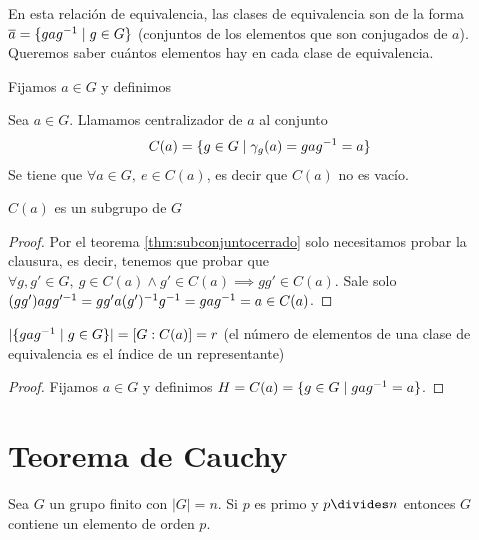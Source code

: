 En esta relación de equivalencia, las clases de equivalencia son de la forma $\overline{a} = \{gag^{-1} \mid g \in G\}$ (conjuntos de los elementos que son conjugados de $a$). Queremos saber cuántos elementos hay en cada clase de equivalencia.

Fijamos $a \in G$ y definimos

\begin{dfn}
	\label{dfn:centralizador}
	Sea $a \in G$. Llamamos centralizador de $a$ al conjunto
	\begin{align}
	C(a) = \{g \in G \mid \gamma_g(a) = g a g^{-1} = a\}
	\end{align}
	Se tiene que $\forall a \in G,\ e \in C(a)$, es decir que $C(a)$ no es vacío.
\end{dfn}

\begin{pro}
	$C(a)$ es un subgrupo de $G$
\end{pro}

\begin{proof}
	Por el teorema \ref{thm:subconjuntocerrado} solo necesitamos probar la clausura, es decir, tenemos que probar que $\forall g,g' \in G,\ g \in C(a) \land g' \in C(a) \implies gg' \in C(a)$. Sale solo $(gg')agg'^{-1} = gg'a(g')^{-1}g^{-1} = gag^{-1} = a \in C(a)$.
\end{proof}

\begin{pro}
	\label{pro:cardinalcajas}
	$|\{gag^{-1} \mid g \in G\}| = [G:C(a)] = r$ (el número de elementos de una clase de equivalencia es el índice de un representante)
\end{pro}

\begin{proof}
	Fijamos $a \in G$ y definimos $H = C(a) = \{g \in G \mid gag^{-1} = a\}$.
\end{proof}



\section{Teorema de Cauchy}

\begin{thm}[de Cauchy]
	Sea $G$ un grupo finito con $|G| = n$. Si $p$ es primo y $p\divides n$ entonces $G$ contiene un elemento de orden $p$.
\end{thm}

